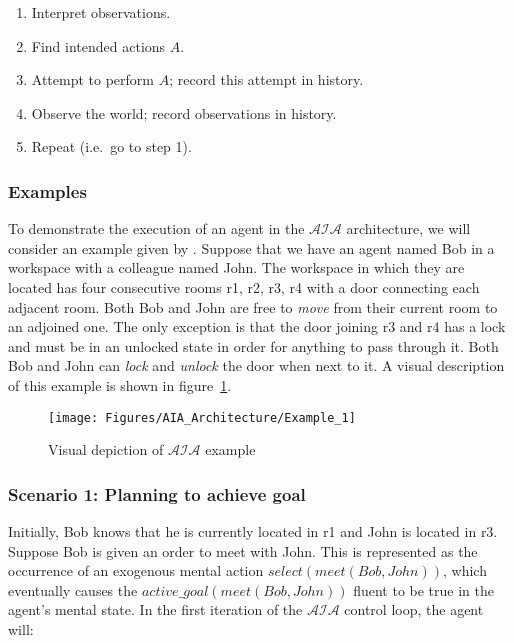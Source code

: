 \begin{enumerate}
    \item Interpret observations.
    \item Find intended actions $A$.
    \item Attempt to perform $A$;
        record this attempt in history.
    \item Observe the world;
        record observations in history.
    \item Repeat (i.e.~go to step 1).
\end{enumerate}

\subsubsection{Examples}
\label{subsubsec:aia_examples}

To demonstrate the execution of an agent in the $\mathcal{AIA}$ architecture, we will consider an example given by \citet{blount_architecture_2013}.
Suppose that we have an agent named Bob in a workspace with a colleague named John.
The workspace in which they are located has four consecutive rooms r1, r2, r3, r4 with a door connecting each adjacent room.
Both Bob and John are free to \textit{move} from their current room to an adjoined one.
The only exception is that the door joining r3 and r4 has a lock and must be in an unlocked state in order for anything to pass through it.
Both Bob and John can \textit{lock} and \textit{unlock} the door when next to it.
A visual description of this example is shown in figure~\ref{fig:aia_example}.

\begin{figure}[h]
    \centering
    \texttt{[image: Figures/AIA\_Architecture/Example\_1]}
    \caption{Visual depiction of $\mathcal{AIA}$ example}
    \label{fig:aia_example}
\end{figure}

\subsubsection{Scenario 1: Planning to achieve goal~\citep{blount_towards_2014}}
\label{subsubsec:aia_scenario_1}

Initially, Bob knows that he is currently located in r1 and John is located in r3.
Suppose Bob is given an order to meet with John.
This is represented as the occurrence of an exogenous mental action $select(meet(Bob, John))$, which eventually causes the $active\_goal(meet(Bob, John))$ fluent to be true in the agent's mental state.
In the first iteration of the $\mathcal{AIA}$ control loop, the agent will:

